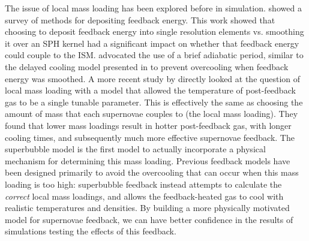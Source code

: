 The issue of local mass loading has been explored before in simulation.
\citet{Thacker2000} showed a survey of methods for depositing feedback energy.
This work showed that choosing to deposit feedback energy into single resolution
elements vs. smoothing it over an SPH kernel had a significant impact on whether
that feedback energy could couple to the ISM.  \citet{Thacker2000} advocated the
use of a brief adiabatic period, similar to the delayed cooling model presented
in \citet{Rosdahl2016} to prevent overcooling when feedback energy was smoothed.
A more recent study by \citet{DallaVecchia2012} directly looked at the question
of local mass loading with a model that allowed the temperature of post-feedback
gas to be a single tunable parameter.  This is effectively the same as choosing
the amount of mass that each supernovae couples to (the local mass loading).  They found that lower mass
loadings result in hotter post-feedback gas, with longer cooling times, and
subsequently much more effective supernovae feedback.  The \citet{Keller2014}
superbubble model is the first model to actually incorporate a physical
mechanism for determining this mass loading.  Previous feedback models have been
designed primarily to avoid the overcooling that can occur when this mass
loading is too high: superbubble feedback instead attempts to calculate the {\it
correct} local mass loadings, and allows the feedback-heated gas to cool with
realistic temperatures and densities.  By building a more physically motivated
model for supernovae feedback, we can have better confidence in the results of
simulations testing the effects of this feedback.


